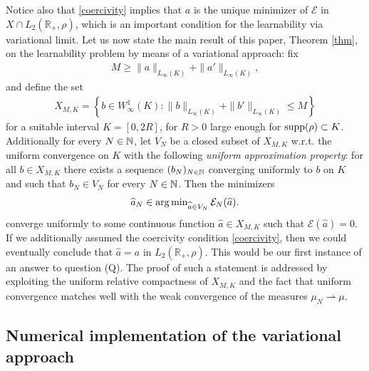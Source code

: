 Notice also that \eqref{coercivity} implies that $a$ is the unique minimizer of $\mathcal E$ in $X \cap  L_2(\mathbb R_+,\rho)$,
which is an important condition for the learnability via variational limit. 
Let us now state the main result of this paper, Theorem \ref{thm},  on the learnability problem by means of a variational approach: fix 
\begin{align*}
	M \geq \|a\|_{L_{\infty}(K)} + \|a'\|_{L_{\infty}(K)},
	\end{align*}
and define the set
\begin{align*}
X_{M,K} = \left\{b \in W^{1}_{\infty}(K) :
 \|b\|_{L_{\infty}(K)} + \|b'\|_{L_{\infty}(K)} \leq M
 \right\}
\end{align*}
for a suitable interval $K=[0,2 R]$, for $R>0$ large enough for $\operatorname{supp}(\rho) \subset K$.
Additionally for every $N \in \mathbb{N}$, let $V_N$ be a closed subset of $X_{M,K}$ w.r.t. the uniform convergence on $K$ with the following {\it uniform approximation property}: for all $b\in X_{M,K}$ there exists a sequence $(b_N)_{N \in \mathbb{N}}$ converging uniformly to $b$ on $K$ and such that $b_N\in V_N$ for every $N \in \mathbb{N}$. Then the minimizers 
	\begin{align} \label{truealgo1}
		\widehat a_N\in\operatorname{arg\,min}_{\widehat a\in V_N} \mathcal E_N(\widehat a).
	\end{align}
 converge uniformly to some continuous function $\widehat a \in X_{M,K}$ such that
	$\mathcal E(\widehat a)=0$. If we additionally assumed the coercivity condition \eqref{coercivity}, then we could eventually conclude that 
	$\widehat a=a$ in $L_2(\mathbb R_+, \rho)$. This would be our first instance of an answer to question (Q). The proof of such a statement is  addressed by exploiting the uniform relative compactness of $X_{M,K}$
and the fact that uniform convergence matches well with the weak convergence of the measures $\mu_N \rightharpoonup \mu$.


\subsection{Numerical implementation of the variational approach }\label{sec:wp3}


